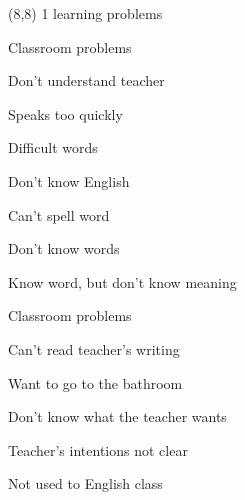 \documentclass[b5paper]{article}
\newcommand{\mycard}[5]{%
	\small #1 #2
	\par
	\parbox{7.5cm}{%
	\Large#3\\
	\normalsize#4 #5
	}
}
\begin{document}
\begin{textblock}{8}(8,8)
\mycard{1}{learning problems}{Classroom problems}{
\begin{description}
	\item Don't understand teacher 
	\begin{description}
		\item Speaks too quickly
		\item Difficult words
	\end{description}
	\item Don't know English
	\begin{description}
		\item Can't spell word
		\item Don't know words
		\item Know word, but don't know meaning
	\end{description}
	\item Classroom problems
	\begin{description}
		\item Can't read teacher's writing
		\item Want to go to the bathroom
	\end{description}
	\item Don't know what the teacher wants
	\begin{description}
		\item Teacher's intentions not clear
		\item Not used to English class
	\end{description}
\end{description}
}{}
\end{textblock}
\end{document}
